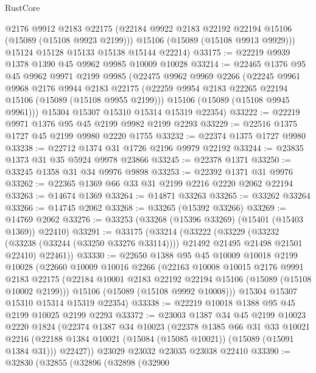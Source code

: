 \begin{lexlean}{RustCore}
\begin{coremodule}
        @2176
        @9912
        @2183
        @22175
        (@22184 @9922 @2183 @22192 @22194 @15106 (@15089 (@15108 @9923 @2199)))
        @15106
        (@15089 (@15108 @9913 @9929)))
      @15124
      @15128
      @15133
      @15138
      @15144
      @22214)
@33175 := @22219 @9939 @1378 @1390 @45 @9962 @9985 @10009 @10028
@33214 := @22465
    @1376
    @95
    @45
    @9962
    @9971
    @2199
    @9985
    (@22475
      @9962
      @9969
      @2266
      (@22245
        @9961
        @9968
        @2176
        @9944
        @2183
        @22175
        (@22259 @9954 @2183 @22265 @22194 @15106 (@15089 (@15108 @9955 @2199)))
        @15106
        (@15089 (@15108 @9945 @9961)))
      @15304
      @15307
      @15310
      @15314
      @15319
      @22354)
@33222 := @22219 @9971 @1376 @95 @45 @2199 @9982 @2199 @2293
@33229 := @22516 @1375 @1727 @45 @2199 @9980 @2220 @1755
@33232 := @22374 @1375 @1727 @9980
@33238 := @22712 @1374 @31 @1726 @2196 @9979 @22192
@33244 := @23835 @1373 @31 @35 @5924 @9978 @23866
@33245 := @22378 @1371
@33250 := @33245 @1358 @31 @34 @9976 @9898
@33253 := @22392 @1371 @31 @9976
@33262 := @22365 @1369 @66 @33 @31 @2199 @2216 @2220 @2062 @22194
@33263 := @14674 @1369
@33264 := @14871 @33263
@33265 := @33262 @33264
@33266 := @14745 @2062
@33268 := @33265 (@15392 @33266)
@33269 := @14769 @2062
@33276 := @33253 (@33268 (@15396 @33269) (@15401 (@15403 @1369)) @22410)
@33291 := @33175
    (@33214
      (@33222
        (@33229
          (@33232 (@33238 (@33244 (@33250 @33276 @33114))))
          @21492
          @21495
          @21498
          @21501
          @22410)
        @22461))
@33330 := @22650
    @1388
    @95
    @45
    @10009
    @10018
    @2199
    @10028
    (@22660
      @10009
      @10016
      @2266
      (@22163
        @10008
        @10015
        @2176
        @9991
        @2183
        @22175
        (@22184 @10001 @2183 @22192 @22194 @15106 (@15089 (@15108 @10002 @2199)))
        @15106
        (@15089 (@15108 @9992 @10008)))
      @15304
      @15307
      @15310
      @15314
      @15319
      @22354)
@33338 := @22219 @10018 @1388 @95 @45 @2199 @10025 @2199 @2293
@33372 := @23003
    @1387
    @34
    @45
    @2199
    @10023
    @2220
    @1824
    (@22374
      @1387
      @34
      @10023
      (@22378
        @1385
        @66
        @31
        @33
        @10021
        @2216
        (@22188 @1384 @10021 (@15084 (@15085 @10021)) (@15089 (@15091 @1384 @31)))
        @22427))
    @23029
    @23032
    @23035
    @23038
    @22410
@33390 := @32830
    (@32855
      (@32896
        (@32898
          (@32900

\end{coremodule}
\end{lexlean}
